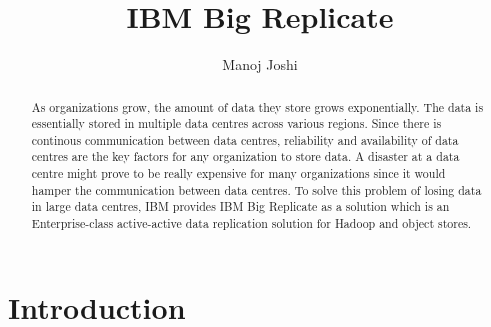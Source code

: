 
\title{IBM Big Replicate}


\author{Manoj Joshi}

\renewcommand{\shortauthors}{Manoj}


\begin{abstract}
As organizations grow, the amount of data they store grows exponentially. The 
data is essentially stored in multiple data centres across various regions. 
Since there is continous communication between data centres, reliability and 
availability of data centres are the key factors for any organization to store 
data. A disaster at a data centre might prove to be really expensive for many 
organizations since it would hamper the communication between data centres. To 
solve this problem of losing data in large data centres, IBM provides IBM Big
Replicate as a solution which is an Enterprise-class active-active data 
replication solution for Hadoop and object stores.
\end{abstract}



\maketitle

\section{Introduction}

